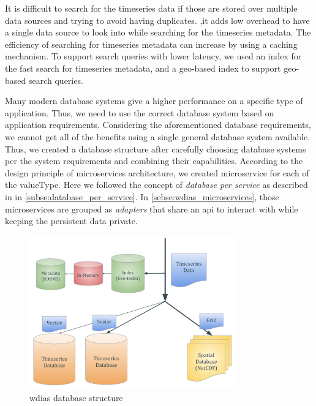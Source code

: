 It is difficult to search for the timeseries data if those are stored over multiple data sources and trying to avoid having duplicates. ,it adds low overhead to have a single data source to look into while searching for the timeseries metadata. The efficiency of searching for timeseries metadata can increase by using a caching mechanism. To support search queries with lower latency, we used an index for the fast search for timeseries metadata, and a geo-based index to support geo-based search queries.

Many modern database systems give a higher performance on a specific type of application. Thus, we need to use the correct database system based on application requirements. Considering the aforementioned database requirements, we cannot get all of the benefits using a single general database system available. Thus, we created a database structure after carefully choosing database systems per the system requirements and combining their capabilities. According to the design principle of microservices architecture, we created microservice for each of the valueType. Here we followed the concept of \emph{database per service} as described in in \cref{subse:database_per_service}. In \cref{sebse:wdias_microservices}, those microservices are grouped as \emph{adapters} that share an \acrshort{api} to interact with while keeping the persistent data private.

\begin{figure}[htp]
    \centering
    \includegraphics[width=0.8\textwidth]{method/microservice/wdias_database_structure.pdf}
    \caption{\acrshort{wdias} database structure}
    \label{fi:database_structure}
\end{figure}


